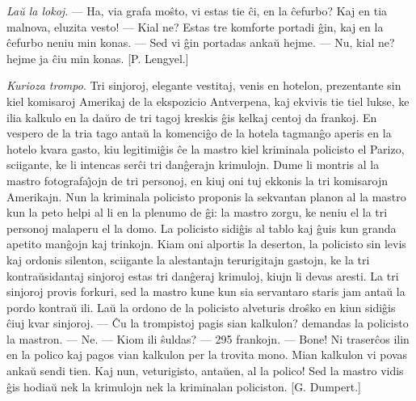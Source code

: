 \emph{La\u u la lokoj}. --- Ha, via grafa mo\^sto, vi estas tie
\^ci, en la \^cefurbo? Kaj en tia malnova, eluzita vesto! --- Kial
ne? Estas tre komforte portadi \^gin, kaj en la \^cefurbo neniu min
konas. --- Sed vi \^gin portadas anka\u u hejme. --- Nu, kial ne?
hejme ja \^ciu min konas. [P. Lengyel.]

\emph{Kurioza trompo}. Tri sinjoroj, elegante vestitaj, venis en
hotelon, prezentante sin kiel komisaroj Amerikaj de la ekspozicio
Antverpena, kaj ekvivis tie tiel lukse, ke ilia kalkulo en la da\u
uro de tri tagoj kreskis \^gis kelkaj centoj da frankoj. En vespero
de la tria tago anta\u u la komenci\^go de la hotela tagman\^go
aperis en la hotelo kvara gasto, kiu legitimi\^gis \^ce la mastro
kiel kriminala policisto el Parizo, sciigante, ke li intencas
ser\^ci tri dan\^gerajn krimulojn. Dume li montris al la mastro
fotografa\^{\j}ojn de tri personoj, en kiuj oni tuj ekkonis la tri
komisarojn Amerikajn. Nun la kriminala policisto proponis la
sekvantan planon al la mastro kun la peto helpi al li en la plenumo
de \^gi: la mastro zorgu, ke neniu el la tri personoj malaperu el la
domo. La policisto sidi\^gis al tablo kaj \^guis kun granda apetito
man\^gojn kaj trinkojn. Kiam oni alportis la deserton, la policisto
sin levis kaj ordonis silenton, sciigante la alestantajn
terurigitajn gastojn, ke la tri kontra\u usidantaj sinjoroj estas
tri dan\^geraj krimuloj, kiujn li devas aresti. La tri sinjoroj
provis forkuri, sed la mastro kune kun sia servantaro staris jam
anta\u u la pordo kontra\u u ili. La\u u la ordono de la policisto
alveturis dro\^sko en kiun sidi\^gis \^ciuj kvar sinjoroj. --- \^Cu
la trompistoj pagis sian kalkulon? demandas la policisto la mastron.
--- Ne. --- Kiom ili \^suldas? --- 295 frankojn. --- Bone! Ni
traser\^cos ilin en la polico kaj pagos vian kalkulon per la trovita
mono. Mian kalkulon vi povas anka\u u sendi tien. Kaj nun,
veturigisto, anta\u uen, al la polico! Sed la mastro vidis \^gis
hodia\u u nek la krimulojn nek la kriminalan policiston. [G.
Dumpert.]

